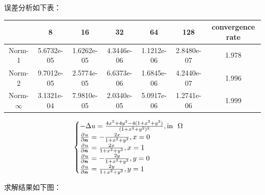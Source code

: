 \documentclass[lang=cn,a4paper,newtx,bibend=bibtex]{elegantpaper}
\begin{document}
误差分析如下表：

\begin{table}[H]
  \centering
  \begin{tabular}{|c|c|c|c|c|c|c|}
  \hline
   & 8 & 16 & 32 & 64 & 128 & convergence rate \\
  \hline
  Norm-1 & 5.6732e-05 & 1.6262e-05 & 4.3446e-06 & 1.1212e-06 & 2.8480e-07 & 1.978 \\
  Norm-2 & 9.7012e-05 & 2.5774e-05 & 6.6373e-06 & 1.6845e-06 & 4.2440e-07 & 1.996 \\
  Norm-$\infty$ & 3.1321e-04 & 7.9810e-05 & 2.0340e-05 & 5.0917e-06 & 1.2741e-06 & 1.999 \\
  \hline
  \end{tabular}
  \end{table}


\[
\begin{cases}
  - \Delta u = \frac{4x^2 + 4y^2 - 4(1 + x^2 + y^2)}{(1 + x^2 + y^2)^2}, \text{in~~} \Omega\\
  \frac{\partial^{}{u}}{\partial {\bm{n}}^{}} = -\frac{2x}{1+x^2+y^2}, x = 0 \\
  \frac{\partial^{}{u}}{\partial {\bm{n}}^{}} = \frac{2x}{1+x^2+y^2}, x = 1 \\  
  \frac{\partial^{}{u}}{\partial {\bm{n}}^{}} = -\frac{2y}{1+x^2+y^2}, y = 0 \\
  \frac{\partial^{}{u}}{\partial {\bm{n}}^{}} = \frac{2y}{1+x^2+y^2}, y = 1 \\ 
\end{cases}
\]

求解结果如下图：
\end{document}
